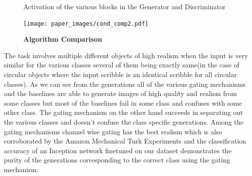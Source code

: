 \begin{figure}%
    \centering
    \caption{Activation of the various blocks in the Generator and Discriminator}
    \label{fig:mnist_act}
    \vspace{-3mm}
\end{figure}


\begin{figure}[h]
    \centering
    \texttt{[image: paper\_images/cond\_comp2.pdf]}
    \caption{{\bf Algorithm Comparison} \label{fig:alg_comp} }
    \vspace{-4mm}
\end{figure}

The task involves multiple different objects of high realism when the input is very similar for the various classes several of them being exactly same(in the case of circular objects where the input scribble is an identical scribble for all circular classes). As we can see from the generations  all of the various gating mechanisms and the baselines are able to generate images of high quality and realism from some classes but most of the baselines fail in some class and confuses with some other class. The gating mechanism on the other hand succeeds in separating out the various classes and doesn't confuse the class specific generations. Among the gating mechanisms channel wise gating has the best realism which is also corroborated by the Amazon Mechanical Turk Experiments and the classification accuracy of an Inception network finetuned on our dataset demonstrates the purity of the generations corresponding to the correct class using the gating mechanism.  



